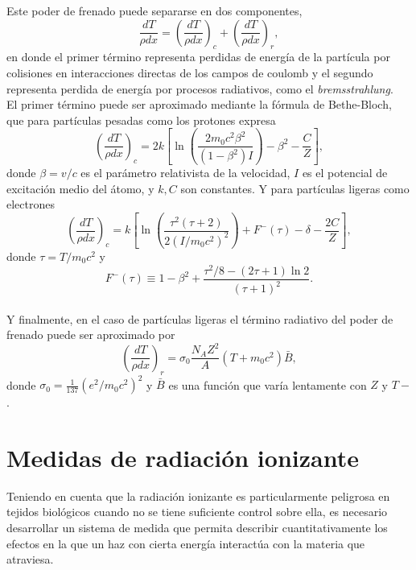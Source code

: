 Este poder de frenado puede separarse en dos componentes, 
\begin{equation}
	\frac{dT}{\rho dx}=\left(\frac{dT}{\rho dx}\right)_c+\left(\frac{dT}{\rho dx}\right)_r,
\end{equation}   
en donde el primer término representa perdidas de energía de la partícula por colisiones en interacciones directas de los campos de coulomb y el segundo representa perdida de energía por procesos radiativos, como el \textit{bremsstrahlung}.\\

El primer término puede ser aproximado mediante la fórmula de Bethe-Bloch, que para partículas pesadas como los protones expresa
\begin{equation}
	\left(\frac{d T}{\rho d x}\right)_{c}=2 k\left[\ln \left(\frac{2 m_{0} c^{2} \beta^{2}}{\left(1-\beta^{2}\right) I}\right)-\beta^{2} -\frac{C}{Z}\right],
\end{equation}
donde $\beta=v/c$ es el parámetro relativista de la velocidad, $I$ es el potencial de excitación medio del átomo, y $k,C$ son constantes. Y para partículas ligeras como electrones
\begin{equation}\left(\frac{d T}{\rho d x}\right)_{c}=k\left[\ln \left(\frac{\tau^{2}(\tau+2)}{2\left(I / m_{0} c^{2}\right)^{2}}\right)+F^{-}(\tau)-\delta-\frac{2 C}{Z}\right],\end{equation}
donde $\tau=T/m_0c^2$ y 
\begin{equation}F^{-}(\tau) \equiv 1-\beta^{2}+\frac{\tau^{2} / 8-(2 \tau+1) \ln 2}{(\tau+1)^{2}}.\end{equation}\\

Y finalmente, en el caso de partículas ligeras el término radiativo del poder de frenado puede ser aproximado por 
\begin{equation}\left(\frac{d T}{\rho d x}\right)_{r}=\sigma_{0} \frac{N_{A} Z^{2}}{A}\left(T+m_{0} c^{2}\right) \bar{B},\end{equation}
donde $\sigma_0=\frac{1}{137}(e^2/m_0c^2)^2$ y $\bar{B}$ es una función que varía lentamente con $Z$ y $T-$.

\section{Medidas de radiación ionizante}
Teniendo en cuenta que la radiación ionizante es particularmente peligrosa en tejidos biológicos cuando no se tiene suficiente control sobre ella, es necesario desarrollar un sistema de medida que permita describir cuantitativamente los efectos en la que un haz con cierta energía interactúa con la materia que atraviesa.\\

